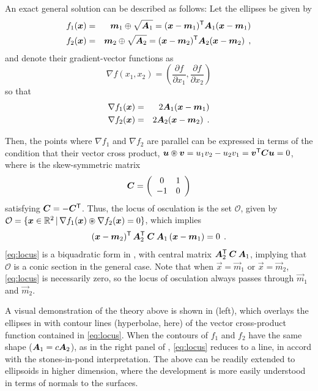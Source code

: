 An exact general solution can be described as follows:  Let the ellipses be given by
\begin{eqnarray*}
f_1(\bm{x}) & = & \bm{m}_1 \oplus \sqrt{\bm{A}_1} = (\bm{x}-\bm{m}_1)^\mathsf{T} \bm{A}_1 (\bm{x}-\bm{m}_1) \\
f_2(\bm{x}) & = & \bm{m}_2 \oplus \sqrt{\bm{A}_2} = (\bm{x}-\bm{m}_2)^\mathsf{T} \bm{A}_2 (\bm{x}-\bm{m}_2) \:\: , \\
\end{eqnarray*}
and denote their gradient-vector functions as
\begin{equation}
\nabla f(x_1, x_2) = \left(\frac{\partial f}{\partial x_1}, \frac{\partial f}{\partial x_2} \right)
\end{equation}
so that
\begin{eqnarray*}
\nabla f_1(\bm{x}) & = & 2 \bm{A}_1 (\bm{x}-\bm{m}_1) \\
\nabla f_2(\bm{x}) & = & 2 \bm{A}_2 (\bm{x}-\bm{m}_2) \:\: . \\
\end{eqnarray*}

Then, the points where $\nabla f_1$ and $\nabla f_2$ are parallel can be expressed in terms of the
condition that their vector cross product,
$\bm{u} \circledast \bm{v} = u_1 v_2 - u_2 v_1 = \bm{v}^\mathsf{T} \bm{C} \bm{u} = 0$, where  is the skew-symmetric matrix
\begin{equation*}
\bm{C} = \left(
\begin{array}{cc}
 0 & 1 \\ -1 & 0
\end{array}
\right)
\end{equation*}
satisfying $\bm{C} = -\bm{C}^\mathsf{T}$.
Thus, the locus of osculation is the set $\mathcal{O}$, given by $\mathcal{O}  = \{\bm{x} \in \mathbb{R}^{2} \, | \, \nabla f_1(\bm{x}) \circledast \nabla f_2(\bm{x}) = 0 \}$,
which implies
\begin{equation}
(\bm{x}-\bm{m}_2)^\mathsf{T} \, \bm{A}_2 ^\mathsf{T} \: \bm{C} \: \bm{A}_1 \, (\bm{x}-\bm{m}_1) = 0  \:\: .  \label{eq:locus}
\end{equation}
\eqref{eq:locus} is a biquadratic form in , with central matrix $\bm{A}_2 ^\mathsf{T} \: \bm{C} \: \bm{A}_1$,
implying that $\mathcal{O}$ is a conic section in the general case. Note that when $\vec{x}=\vec{m}_1$ or $\vec{x}=\vec{m}_2$,
\eqref{eq:locus} is necessarily zero, so the locus of osculation always passes through  $\vec{m}_1$ and $\vec{m}_2$.

A visual demonstration of the theory above is
shown in  (left), which overlays the ellipses in  with contour lines
(hyperbolae, here)
of
the vector cross-product function contained in \eqref{eq:locus}.
When the contours of $f_1$ and $f_2$ have the same shape ($\bm{A}_1 = c \bm{A}_2 $), as in the right panel of ,
\eqref{eq:locus}
reduces to a line, in accord with the stones-in-pond interpretation.
The above can be readily extended to ellipsoids in higher dimension, where the development is more easily understood
in terms of normals to the surfaces.

